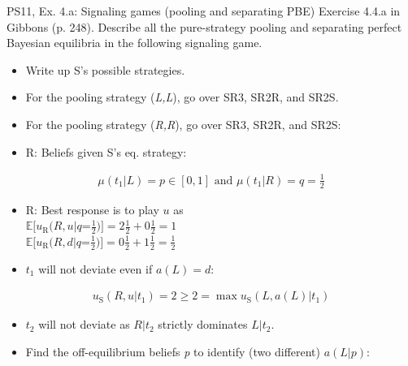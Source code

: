 \begin{frame}{PS11, Ex. 4.a: Signaling games (pooling and separating PBE)}
    Exercise 4.4.a in Gibbons (p. 248). Describe all the pure-strategy pooling and separating perfect Bayesian equilibria in the following signaling game.\vspace{-8pt}
    \begin{multicols}{2}
      \begin{itemize}
        \item[Step 1:] Write up S's possible strategies.
        \item[Step 2:] For the pooling strategy (\textit{L,L}), go over SR3, SR2R, and SR2S.
        \item[Step 3:] For the pooling strategy (\textit{R,R}), go over SR3, SR2R, and SR2S:
        \item[SR3:] R: Beliefs given S's eq. strategy:
      \end{itemize}\vspace{-10pt}
      \begin{align*}
        \mu(t_1|L)=p\in[0,1]\text{ and }\mu(t_1|R)=q=\frac{1}{2}
      \end{align*}\vspace{-18pt}
      \begin{itemize}
        \item[SR2R:] R: Best response is to play $u$ as\\
          $\mathbb{E}[u_\text{R}(R,u|q$=$\frac{1}{2})]=2\frac{1}{2}+0\frac{1}{2}=1$\\
          $\mathbb{E}[u_\text{R}(R,d|q$=$\frac{1}{2})]=0\frac{1}{2}+1\frac{1}{2}=\frac{1}{2}$
        \item[SR2S:] $t_1$ will not deviate even if $a(L)=d$:
      \end{itemize}\vspace{-10pt}
      \begin{align*}
        u_\text{S}(R,u|t_1)=2\geq2=\max u_\text{S}(L,a(L)|t_1)
      \end{align*}\vspace{-20pt}
      \begin{itemize}
        \item[] $t_2$ will not deviate as $R|t_2$ strictly dominates $L|t_2$.
        \item[PBE:] Find the off-equilibrium beliefs \textit{p} to identify (two different) $a(L|p)$:
      \end{itemize}\vspace{-10pt}
      \begin{align*}

\end{align*}
\end{multicols}
\end{frame}
